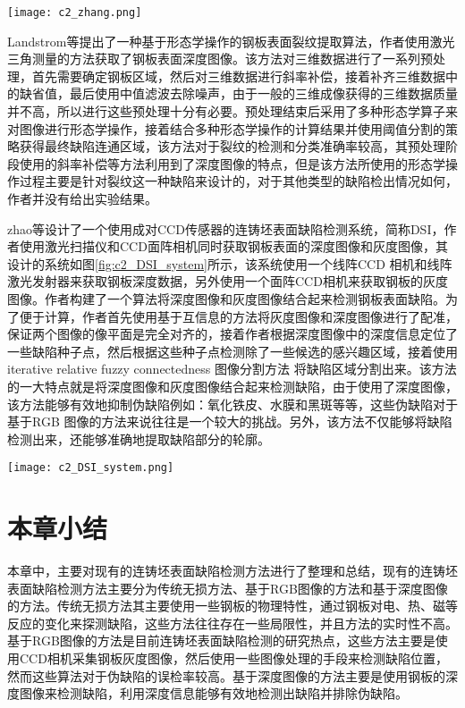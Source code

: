     \begin{figure*}[!h]
    \centering
    \texttt{[image: c2\_zhang.png]}
    \caption{系统设计图}
    \label{fig:c2_zhang}
    \end{figure*}

    Landstrom等\cite{Landstrom2012Morphology}提出了一种基于形态学操作的钢板表面裂纹提取算法，作者使用激光三角测量的方法获取了钢板表面深度图像。该方法对三维数据进行了一系列预处理，首先需要确定钢板区域，然后对三维数据进行斜率补偿，接着补齐三维数据中的缺省值，最后使用中值滤波去除噪声，由于一般的三维成像获得的三维数据质量并不高，所以进行这些预处理十分有必要。预处理结束后采用了多种形态学算子来对图像进行形态学操作，接着结合多种形态学操作的计算结果并使用阈值分割的策略获得最终缺陷连通区域，该方法对于裂纹的检测和分类准确率较高，其预处理阶段使用的斜率补偿等方法利用到了深度图像的特点，但是该方法所使用的形态学操作过程主要是针对裂纹这一种缺陷来设计的，对于其他类型的缺陷检出情况如何，作者并没有给出实验结果。

    zhao等\cite{Zhao2014Defect}设计了一个使用成对CCD传感器的连铸坯表面缺陷检测系统，简称DSI，作者使用激光扫描仪和CCD面阵相机同时获取钢板表面的深度图像和灰度图像，其设计的系统如图\ref{fig:c2_DSI_system}所示，该系统使用一个线阵CCD 相机和线阵激光发射器来获取钢板深度数据，另外使用一个面阵CCD相机来获取钢板的灰度图像。作者构建了一个算法将深度图像和灰度图像结合起来检测钢板表面缺陷。为了便于计算，作者首先使用基于互信息的方法将灰度图像和深度图像进行了配准，保证两个图像的像平面是完全对齐的，接着作者根据深度图像中的深度信息定位了一些缺陷种子点，然后根据这些种子点检测除了一些候选的感兴趣区域，接着使用iterative relative fuzzy connectedness 图像分割方法\cite{Udupa2014Body, Udupa1996Disclaimer} 将缺陷区域分割出来。该方法的一大特点就是将深度图像和灰度图像结合起来检测缺陷，由于使用了深度图像，该方法能够有效地抑制伪缺陷例如：氧化铁皮、水膜和黑斑等等，这些伪缺陷对于基于RGB 图像的方法来说往往是一个较大的挑战。另外，该方法不仅能够将缺陷检测出来，还能够准确地提取缺陷部分的轮廓。

    \begin{figure*}[!h]
    \centering
    \texttt{[image: c2\_DSI\_system.png]}
    \caption{DSI系统设计图}
    \label{fig:c2_DSI_system}
    \end{figure*}


    \section{本章小结}
    本章中，主要对现有的连铸坯表面缺陷检测方法进行了整理和总结，现有的连铸坯表面缺陷检测方法主要分为传统无损方法、基于RGB图像的方法和基于深度图像的方法。传统无损方法其主要使用一些钢板的物理特性，通过钢板对电、热、磁等反应的变化来探测缺陷，这些方法往往存在一些局限性，并且方法的实时性不高。基于RGB图像的方法是目前连铸坯表面缺陷检测的研究热点，这些方法主要是使用CCD相机采集钢板灰度图像，然后使用一些图像处理的手段来检测缺陷位置，然而这些算法对于伪缺陷的误检率较高。基于深度图像的方法主要是使用钢板的深度图像来检测缺陷，利用深度信息能够有效地检测出缺陷并排除伪缺陷。

